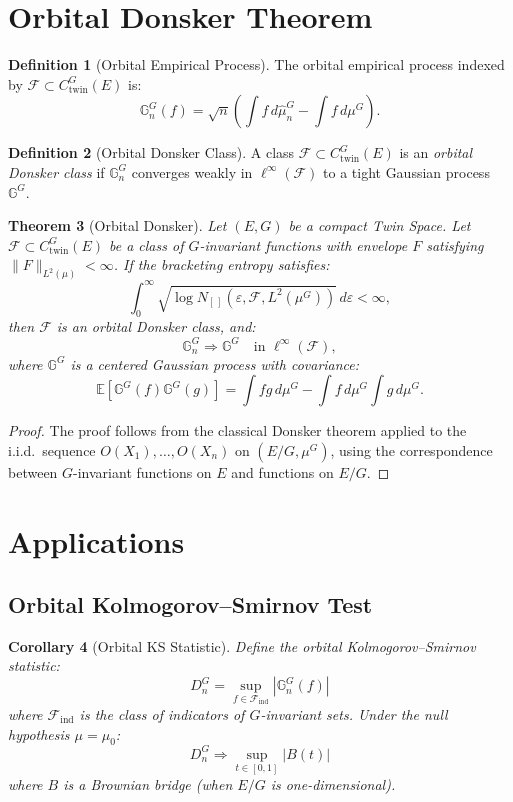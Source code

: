 \documentclass[11pt,twoside,openright]{book}
\theoremstyle{plain}
\newtheorem{theorem}{Theorem}[chapter]
\newtheorem{corollary}[theorem]{Corollary}
\theoremstyle{definition}
\newtheorem{definition}[theorem]{Definition}
\theoremstyle{remark}
\newcommand{\calF}{\mathcal{F}}
\newcommand{\norm}[1]{\|#1\|}
\newcommand{\E}{\mathbb{E}}
\begin{document}
\section{Orbital Donsker Theorem}

\begin{definition}[Orbital Empirical Process]
The orbital empirical process indexed by $\calF \subset C_{\text{twin}}^G(E)$ is:
\[
\mathbb{G}_n^G(f) = \sqrt{n}\left(\int f \, d\hat{\mu}_n^G - \int f \, d\mu^G\right).
\]
\end{definition}

\begin{definition}[Orbital Donsker Class]
A class $\calF \subset C_{\text{twin}}^G(E)$ is an \emph{orbital Donsker class} if $\mathbb{G}_n^G$ converges weakly in $\ell^\infty(\calF)$ to a tight Gaussian process $\mathbb{G}^G$.
\end{definition}

\begin{theorem}[Orbital Donsker]
\label{thm:Donsker}
Let $(E, G)$ be a compact Twin Space. Let $\calF \subset C_{\text{twin}}^G(E)$ be a class of $G$-invariant functions with envelope $F$ satisfying $\norm{F}_{L^2(\mu)} < \infty$. If the bracketing entropy satisfies:
\[
\int_0^\infty \sqrt{\log N_{[\,]}(\varepsilon, \calF, L^2(\mu^G))} \, d\varepsilon < \infty,
\]
then $\calF$ is an orbital Donsker class, and:
\[
\mathbb{G}_n^G \Rightarrow \mathbb{G}^G \quad \text{in } \ell^\infty(\calF),
\]
where $\mathbb{G}^G$ is a centered Gaussian process with covariance:
\[
\E[\mathbb{G}^G(f) \mathbb{G}^G(g)] = \int fg \, d\mu^G - \int f \, d\mu^G \int g \, d\mu^G.
\]
\end{theorem}

\begin{proof}
The proof follows from the classical Donsker theorem applied to the i.i.d.\ sequence $O(X_1), \ldots, O(X_n)$ on $(E/G, \mu^G)$, using the correspondence between $G$-invariant functions on $E$ and functions on $E/G$.
\end{proof}

\section{Applications}

\subsection{Orbital Kolmogorov--Smirnov Test}

\begin{corollary}[Orbital KS Statistic]
Define the orbital Kolmogorov--Smirnov statistic:
\[
D_n^G = \sup_{f \in \calF_{\text{ind}}} |\mathbb{G}_n^G(f)|
\]
where $\calF_{\text{ind}}$ is the class of indicators of $G$-invariant sets. Under the null hypothesis $\mu = \mu_0$:
\[
D_n^G \Rightarrow \sup_{t \in [0,1]} |B(t)|
\]
where $B$ is a Brownian bridge (when $E/G$ is one-dimensional).
\end{corollary}
\end{document}
